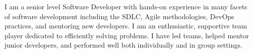 
\begin{cvparagraph}
I am a senior level Software Developer with hands-on experience in many facets of software development including
the SDLC, Agile methodologies, DevOps practices, and mentoring new developers.
I am an enthusiastic, supportive team player dedicated to efficiently solving problems.
I have led teams, helped mentor junior developers, and performed well both individually and in group settings.
\end{cvparagraph}